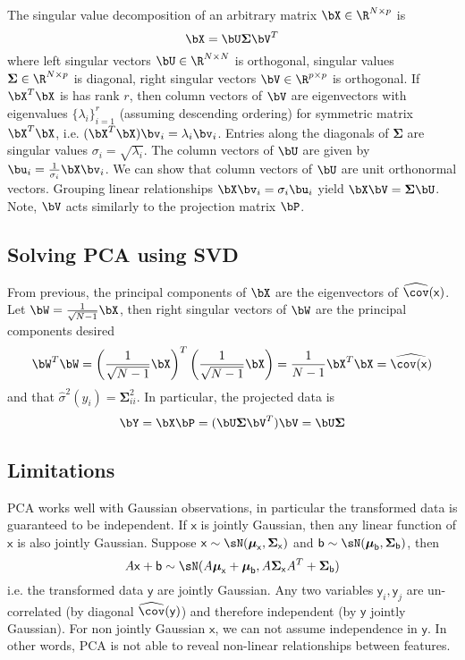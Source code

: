 \documentclass[11pt]{article}
\newcommand\ry{\ensuremath{\mathsf{y}}}
\newcommand\rx{\ensuremath{\mathsf{x}}}
\newcommand\rb{\ensuremath{\mathsf{b}}}
\renewcommand\bmu{\ensuremath{\boldsymbol{\mu}}}
\newcommand\bSigma{\ensuremath{\boldsymbol{\Sigma}}}
\begin{document}
The singular value decomposition of an arbitrary matrix $\bX \in \R^{N\times p}$ is
\[
    \bX = \bU \boldsymbol{\Sigma} \bV^T
\]
where left singular vectors $\bU \in \R^{N\times N}$ is orthogonal, singular values $\boldsymbol{\Sigma} \in \R^{N\times p}$ is diagonal, right singular vectors $\bV \in \R^{p\times p}$ is orthogonal. If $\bX^T\bX$ is has rank $r$, then column vectors of $\bV$ are eigenvectors with eigenvalues $\{\lambda_i\}_{i=1}^r$ (assuming descending ordering) for symmetric matrix $\bX^T\bX$, i.e. $(\bX^T\bX) \bv_i = \lambda_i \bv_i$. Entries along the diagonals of $\boldsymbol{\Sigma}$ are singular values $\sigma_i = \sqrt{\lambda_i}$. The column vectors of $\bU$ are given by $\bu_i = \frac{1}{\sigma_i} \bX \bv_i$. We can show that column vectors of $\bU$ are unit orthonormal vectors. Grouping linear relationships $\bX \bv_i = \sigma_i \bu_i$ yield $\bX \bV = \boldsymbol{\Sigma}\bU$. Note, $\bV$ acts similarly to the projection matrix $\bP$. 

\subsection{Solving PCA using SVD}

From previous, the principal components of $\bX$ are the eigenvectors of $\widehat{\cov}(\rx)$. Let $\bW = \frac{1}{\sqrt{N-1}} \bX$, then right singular vectors of $\bW$ are the principal components desired
\[
    \bW^T\bW 
    = \left( \frac{1}{\sqrt{N-1}} \bX \right)^T \left( \frac{1}{\sqrt{N-1}} \bX \right)
    = \frac{1}{N-1} \bX^T\bX
    = \widehat{\cov(\rx)}
\]
and that $\hat{\sigma}^2(y_i) = \boldsymbol{\Sigma}_{ii}^2$. In particular, the projected data is 
\[
    \bY = \bX\bP = (\bU\bSigma\bV^T)\bV = \bU\bSigma    
\]


\subsection{Limitations}

PCA works well with Gaussian observations, in particular the transformed data is guaranteed to be independent. If $\rx$ is jointly Gaussian, then any linear function of $\rx$ is also jointly Gaussian. Suppose $\rx \sim \sN(\bmu_{\rx},\bSigma_{\rx})$ and $\rb \sim \sN(\boldsymbol{\mu}_{\rb},\boldsymbol{\Sigma}_{\rb})$, then
\[
    A\rx + \rb \sim \sN(A\bmu_{\rx} + \bmu_{\rb}, A\bSigma_{\rx} A^T + \bSigma_{\rb})
\]
i.e. the transformed data $\ry$ are jointly Gaussian. Any two variables $\ry_i,\ry_j$ are un-correlated (by diagonal $\widehat{\cov}(\ry)$) and therefore independent (by $\ry$ jointly Gaussian). For non jointly Gaussian $\rx$, we can not assume independence in $\ry$. In other words, PCA is not able to reveal non-linear relationships between features.
\end{document}
